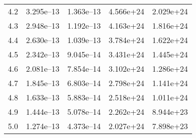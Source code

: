 \documentclass[a4paper,fleqn,usenatbib]{mnras}
\begin{document}
\begin{table*}
\begin{tabular}{ccccc}
    4.2 & 3.295e--13 & 1.363e--13 & 4.566e+24 & 2.029e+24 \\
    4.3 & 2.948e--13 & 1.192e--13 & 4.163e+24 & 1.816e+24 \\
    4.4 & 2.630e--13 & 1.039e--13 & 3.784e+24 & 1.622e+24 \\
    4.5 & 2.342e--13 & 9.045e--14 & 3.431e+24 & 1.445e+24 \\
    4.6 & 2.081e--13 & 7.854e--14 & 3.102e+24 & 1.286e+24 \\
    4.7 & 1.845e--13 & 6.803e--14 & 2.798e+24 & 1.141e+24 \\
    4.8 & 1.633e--13 & 5.883e--14 & 2.518e+24 & 1.011e+24 \\
    4.9 & 1.444e--13 & 5.078e--14 & 2.262e+24 & 8.944e+23 \\
    5.0 & 1.274e--13 & 4.373e--14 & 2.027e+24 & 7.898e+23 \\
    \hline
  \end{tabular}
\end{table*}
\end{document}
